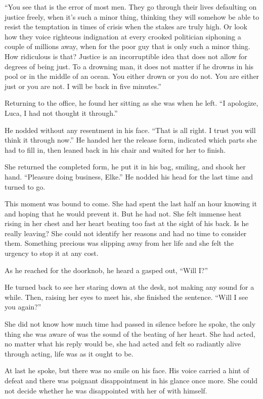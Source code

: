 ``You see that is the error of most men. They go through their lives defaulting on justice freely, when it's such a minor thing, thinking they will somehow be able to resist the temptation in times of crisis when the stakes are truly high. Or look how they voice righteous indignation at every crooked politician siphoning a couple of millions away, when for the poor guy that is only such a minor thing. How ridiculous is that? Justice is an incorruptible idea that does not allow for degrees of being just. To a drowning man, it does not matter if he drowns in his pool or in the middle of an ocean. You either drown or you do not. You are either just or you are not. I will be back in five minutes.''

Returning to the office, he found her sitting as she was when he left. ``I apologize, Luca, I had not thought it through.''

He nodded without any resentment in his face. ``That is all right. I trust you will think it through now.'' He handed her the release form, indicated which parts she had to fill in, then leaned back in his chair and waited for her to finish.

She returned the completed form, he put it in his bag, smiling, and shook her hand. ``Pleasure doing business, Elke.'' He nodded his head for the last time and turned to go.

This moment was bound to come. She had spent the last half an hour knowing it and hoping that he would prevent it. But he had not. She felt immense heat rising in her chest and her heart beating too fast at the sight of his back. Is he really leaving? She could not identify her reasons and had no time to consider them. Something precious was slipping away from her life and she felt the urgency to stop it at any cost.

As he reached for the doorknob, he heard a gasped out, ``Will I?''

He turned back to see her staring down at the desk, not making any sound for a while. Then, raising her eyes to meet his, she finished the sentence. ``Will I see you again?''

She did not know how much time had passed in silence before he spoke, the only thing she was aware of was the sound of the beating of her heart. She had acted, no matter what his reply would be, she had acted and felt so radiantly alive through acting, life was as it ought to be.

At last he spoke, but there was no smile on his face. His voice carried a hint of defeat and there was poignant disappointment in his glance once more. She could not decide whether he was disappointed with her of with himself.

